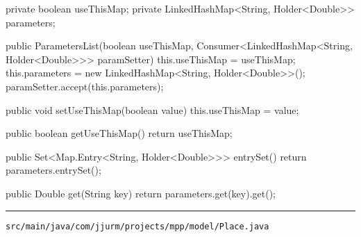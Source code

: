 \begin{javacode}
{{    private boolean useThisMap;
    private LinkedHashMap<String, Holder<Double>> parameters;

    public ParametersList(boolean useThisMap,
        Consumer<LinkedHashMap<String, Holder<Double>>> paramSetter) {
      this.useThisMap = useThisMap;
      this.parameters = new LinkedHashMap<String, Holder<Double>>();
      paramSetter.accept(this.parameters);
    }

    public void setUseThisMap(boolean value) {
      this.useThisMap = value;
    }

    public boolean getUseThisMap() {
      return useThisMap;
    }

    public Set<Map.Entry<String, Holder<Double>>> entrySet() {
      return parameters.entrySet();
    }

    public Double get(String key) {
      return parameters.get(key).get();
    }

  }

}
\end{javacode}

\noindent\rule{\textwidth}{0.4pt}

\nointerlineskip
\texttt{src/main/java/com/jjurm/projects/mpp/model/Place.java}

